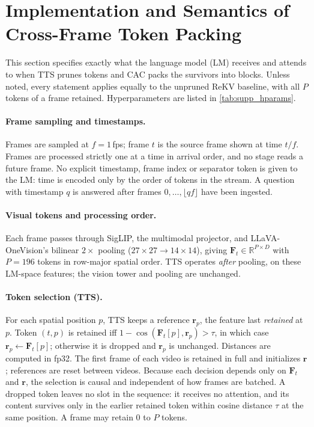 
\section{Implementation and Semantics of Cross-Frame Token Packing}
\label{sec:supp_semantics}

This section specifies exactly what the language model (LM) receives and attends to
when TTS prunes tokens and CAC packs the survivors into blocks. Unless noted, every
statement applies equally to the unpruned ReKV baseline, with all $P$ tokens of a frame
retained. Hyperparameters are listed in \cref{tab:supp_hparams}.

\paragraph{Frame sampling and timestamps.}
Frames are sampled at $f{=}1$\,fps; frame $t$ is the source frame shown at time $t/f$.
Frames are processed strictly one at a time in arrival order, and no stage reads a
future frame. No explicit timestamp, frame index or separator token is given to the LM:
time is encoded only by the order of tokens in the stream. A question with timestamp
$q$ is answered after frames $0,\dots,\lfloor qf\rfloor$ have been ingested.

\paragraph{Visual tokens and processing order.}
Each frame passes through SigLIP, the multimodal projector, and LLaVA-OneVision's
bilinear $2{\times}$ pooling ($27{\times}27\!\to\!14{\times}14$), giving
$\mathbf{F}_t\in\mathbb{R}^{P\times D}$ with $P{=}196$ tokens in row-major spatial
order. TTS operates \emph{after} pooling, on these LM-space features; the vision tower
and pooling are unchanged.

\paragraph{Token selection (TTS).}
For each spatial position $p$, TTS keeps a reference $\mathbf{r}_p$, the feature last
\emph{retained} at $p$. Token $(t,p)$ is retained iff
$1-\cos(\mathbf{F}_t[p],\mathbf{r}_p)>\tau$, in which case $\mathbf{r}_p\leftarrow
\mathbf{F}_t[p]$; otherwise it is dropped and $\mathbf{r}_p$ is unchanged. Distances are
computed in fp32. The first frame of each video is retained in full and initializes
$\mathbf{r}$; references are reset between videos. Because each decision depends only
on $\mathbf{F}_t$ and $\mathbf{r}$, the selection is causal and independent of how
frames are batched. A dropped token leaves no slot in the sequence: it receives no
attention, and its content survives only in the earlier retained token within cosine
distance $\tau$ at the same position. A frame may retain $0$ to $P$ tokens.

